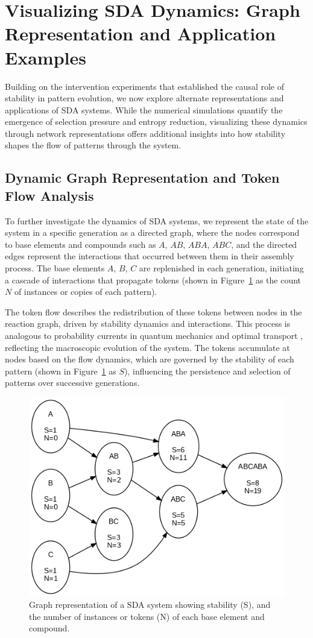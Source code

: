\documentclass[preprint,12pt]{elsarticle}
\begin{document}
\section{Visualizing SDA Dynamics: Graph Representation and Application Examples}

Building on the intervention experiments that established the causal role of stability in pattern evolution, we now explore alternate representations and applications of SDA systems. While the numerical simulations quantify the emergence of selection pressure and entropy reduction, visualizing these dynamics through network representations offers additional insights into how stability shapes the flow of patterns through the system.


\subsection{Dynamic Graph Representation and Token Flow Analysis}

To further investigate the dynamics of SDA systems, we represent the state of the system in a specific generation as a directed graph, where the nodes correspond to base elements and compounds such as $A$, $AB$, $ABA$, $ABC$, and the directed edges represent the interactions that occurred between them in their assembly process. The base elements $A$, $B$, $C$ are replenished in each generation, initiating a cascade of interactions that propagate tokens (shown in Figure~\ref{fig:figure_5} as the count $N$ of instances or copies of each pattern). 

The token flow describes the redistribution of these tokens between nodes in the reaction graph, driven by stability dynamics and interactions. This process is analogous to probability currents in quantum mechanics \cite{feynman1965quantum} and optimal transport \cite{villani2008optimal}, reflecting the macroscopic evolution of the system. The tokens accumulate at nodes based on the flow dynamics, which are governed by the stability of each pattern (shown in Figure~\ref{fig:figure_5} as $S$), influencing the persistence and selection of patterns over successive generations.


\begin{figure}[h]
    \centering
    \includegraphics[width=0.7\linewidth]{figure_5.png}
    \caption{Graph representation of a SDA system showing stability (S), and the number of instances or tokens (N) of each base element and compound.}
    \label{fig:figure_5}
\end{figure}
\end{document}
